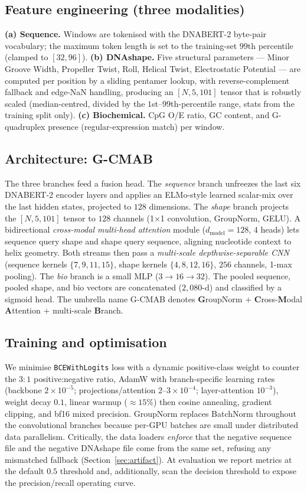 \documentclass[11pt]{article}
\begin{document}
\subsection{Feature engineering (three modalities)}
\textbf{(a) Sequence.} Windows are tokenised with the DNABERT-2 byte-pair vocabulary;
the maximum token length is set to the training-set $99$th percentile (clamped to
$[32,96]$). \textbf{(b) DNAshape.} Five structural parameters --- Minor Groove Width,
Propeller Twist, Roll, Helical Twist, Electrostatic Potential --- are computed per
position by a sliding pentamer lookup, with reverse-complement fallback and edge-NaN
handling, producing an $[N,5,101]$ tensor that is robustly scaled (median-centred,
divided by the $1$st--$99$th-percentile range, stats from the training split only).
\textbf{(c) Biochemical.} CpG O/E ratio, GC content, and G-quadruplex presence
(regular-expression match) per window.

\subsection{Architecture: G-CMAB}
The three branches feed a fusion head. The \emph{sequence} branch unfreezes the last
six DNABERT-2 encoder layers and applies an ELMo-style learned scalar-mix over the
last hidden states, projected to $128$ dimensions. The \emph{shape} branch projects
the $[N,5,101]$ tensor to $128$ channels (1$\times$1 convolution, GroupNorm, GELU).
A bidirectional \emph{cross-modal multi-head attention} module ($d_{\text{model}}=128$,
$4$ heads) lets sequence query shape and shape query sequence, aligning nucleotide
context to helix geometry. Both streams then pass a \emph{multi-scale
depthwise-separable CNN} (sequence kernels $\{7,9,11,15\}$, shape kernels
$\{4,8,12,16\}$, $256$ channels, 1-max pooling). The \emph{bio} branch is a small
MLP ($3{\to}16{\to}32$). The pooled sequence, pooled shape, and bio vectors are
concatenated ($2{,}080$-d) and classified by a sigmoid head. The umbrella name
G-CMAB denotes \textbf{G}roupNorm $+$ \textbf{C}ross-\textbf{M}odal
\textbf{A}ttention $+$ multi-scale \textbf{B}ranch.

\subsection{Training and optimisation}
We minimise \texttt{BCEWithLogits} loss with a dynamic positive-class weight to
counter the $3{:}1$ positive:negative ratio, AdamW with branch-specific learning
rates (backbone $2\times 10^{-5}$; projections/attention $2$--$3\times 10^{-4}$;
layer-attention $10^{-3}$), weight decay $0.1$, linear warmup ($\approx\!15\%$) then
cosine annealing, gradient clipping, and bf16 mixed precision. GroupNorm replaces
BatchNorm throughout the convolutional branches because per-GPU batches are small
under distributed data parallelism. Critically, the data loaders \emph{enforce}
that the negative sequence file and the negative DNAshape file come from the same
set, refusing any mismatched fallback (Section~\ref{sec:artifact}). At evaluation we
report metrics at the default $0.5$ threshold and, additionally, scan the decision
threshold to expose the precision/recall operating curve.
\end{document}
